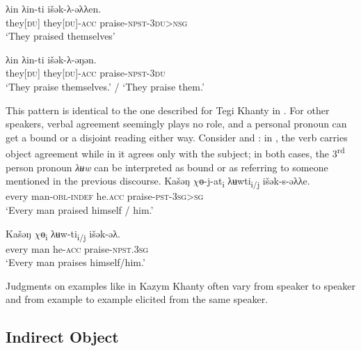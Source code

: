 \documentclass[output=paper]{langscibook}
\begin{document}
\ea 
\label{ex:Volkova:20}
	\ea
	\label{ex:Volkova:20a}
  	 \gll λin λin{}-ti išǝk{}-λ-əλλen.\\
 	 they[\textsc{du}] they[\textsc{du]-acc} praise\textsc{{}-npst-3du>nsg}\\
  	 \glt ‘They praised themselves’

	\ex
	\label{ex:Volkova:20b}
  	 \gll λin λin{}-ti išǝk{}-λ-əŋən.\\
  	 they[\textsc{du}] they[\textsc{du]-acc} praise\textsc{{}-npst-3du}\\
  	 \glt *‘They praise themselves.’ / ‘They praise them.’
	\z
\z
 
This pattern is identical to the one described for Tegi Khanty in \citet{VolkovaReuland2014}. For other speakers, verbal agreement seemingly plays no role, and a personal pronoun can get a bound or a disjoint reading either way. Consider  and : in , the verb carries object agreement while in  it agrees only with the subject; in both cases, the 3\textsuperscript{rd} person pronoun \textit{λʉw} can be interpreted as bound or as referring to someone mentioned in the previous discourse. 
\ea 
\label{ex:Volkova:21}
	\ea
	\label{ex:Volkova:21a}
  	 \gll Kašəŋ $\chi ɵ$-j-at\textsubscript{i} λʉwti\textsubscript{i/j} išək-s-əλλe. \\
  	 every man\textsc{{}-obl-indef} he.\textsc{acc} praise\textsc{{}-pst-3sg>sg}\\
  	 \glt ‘Every man praised himself / him.’

	\ex
	\label{ex:Volkova:21b}
  	 \gll Kašəŋ $\chi ɵ$\textsubscript{i} λʉw-ti\textsubscript{i/j} išək-əλ.\\
  	 every man he\textsc{{}-acc} praise\textsc{{}-npst.3sg}\\
  	 \glt ‘Every man praises himself/him.’
	\z
\z

 
%


Judgments on examples like  in Kazym Khanty often vary from speaker to speaker and from example to example elicited from the same speaker. 

\subsection{{Indirect} {Object}}\label{sec:Volkova:3.2}
\end{document}
